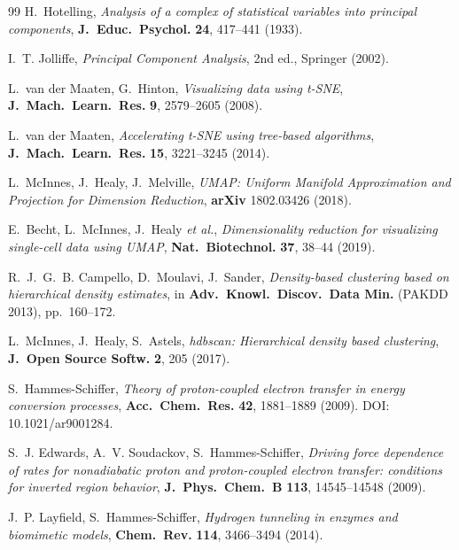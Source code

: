 \documentclass[11pt,a4paper,twoside]{article}
\theoremstyle{remark}
\begin{document}
\begin{thebibliography}{99}
H.~Hotelling,
\emph{Analysis of a complex of statistical variables into principal
components},
\textbf{J.\ Educ.\ Psychol.} \textbf{24}, 417--441 (1933).

I.~T. Jolliffe,
\emph{Principal Component Analysis},
2nd ed., Springer (2002).

L.~van der Maaten, G.~Hinton,
\emph{Visualizing data using t-SNE},
\textbf{J.\ Mach.\ Learn.\ Res.} \textbf{9}, 2579--2605 (2008).

L.~van der Maaten,
\emph{Accelerating t-SNE using tree-based algorithms},
\textbf{J.\ Mach.\ Learn.\ Res.} \textbf{15}, 3221--3245 (2014).

L.~McInnes, J.~Healy, J.~Melville,
\emph{UMAP: Uniform Manifold Approximation and Projection for
Dimension Reduction},
\textbf{arXiv} 1802.03426 (2018).

E.~Becht, L.~McInnes, J.~Healy \emph{et al.},
\emph{Dimensionality reduction for visualizing single-cell data using
UMAP},
\textbf{Nat.\ Biotechnol.} \textbf{37}, 38--44 (2019).

R.~J.~G.~B. Campello, D.~Moulavi, J.~Sander,
\emph{Density-based clustering based on hierarchical density estimates},
in \textbf{Adv.\ Knowl.\ Discov.\ Data Min.} (PAKDD 2013), pp.~160--172.

L.~McInnes, J.~Healy, S.~Astels,
\emph{hdbscan: Hierarchical density based clustering},
\textbf{J.\ Open Source Softw.} \textbf{2}, 205 (2017).


S.~Hammes-Schiffer,
\emph{Theory of proton-coupled electron transfer in energy conversion
processes},
\textbf{Acc.\ Chem.\ Res.} \textbf{42}, 1881--1889 (2009).
DOI: 10.1021/ar9001284.

S.~J. Edwards, A.~V. Soudackov, S.~Hammes-Schiffer,
\emph{Driving force dependence of rates for nonadiabatic proton and
proton-coupled electron transfer: conditions for inverted region behavior},
\textbf{J.\ Phys.\ Chem.\ B} \textbf{113}, 14545--14548 (2009).

J.~P. Layfield, S.~Hammes-Schiffer,
\emph{Hydrogen tunneling in enzymes and biomimetic models},
\textbf{Chem.\ Rev.} \textbf{114}, 3466--3494 (2014).


\end{thebibliography}
\end{document}
